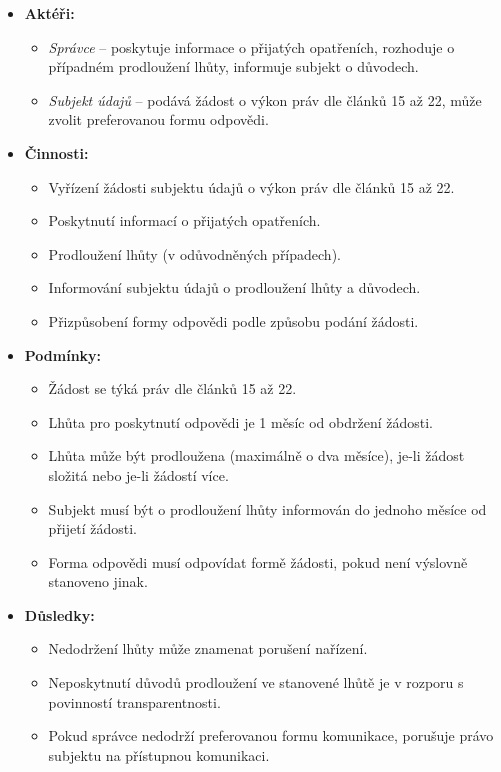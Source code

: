 \begin{itemize}
\item \textbf{Aktéři:}
  \begin{itemize}
    \item \textit{Správce} – poskytuje informace o přijatých opatřeních, rozhoduje o případném prodloužení lhůty, informuje subjekt o důvodech.
    \item \textit{Subjekt údajů} – podává žádost o výkon práv dle článků 15 až 22, může zvolit preferovanou formu odpovědi.
  \end{itemize}

\item \textbf{Činnosti:}
  \begin{itemize}
    \item Vyřízení žádosti subjektu údajů o výkon práv dle článků 15 až 22.
    \item Poskytnutí informací o přijatých opatřeních.
    \item Prodloužení lhůty (v odůvodněných případech).
    \item Informování subjektu údajů o prodloužení lhůty a důvodech.
    \item Přizpůsobení formy odpovědi podle způsobu podání žádosti.
  \end{itemize}

\item \textbf{Podmínky:}
  \begin{itemize}
    \item Žádost se týká práv dle článků 15 až 22.
    \item Lhůta pro poskytnutí odpovědi je 1 měsíc od obdržení žádosti.
    \item Lhůta může být prodloužena (maximálně o dva měsíce), je-li žádost složitá nebo je-li žádostí více.
    \item Subjekt musí být o prodloužení lhůty informován do jednoho měsíce od přijetí žádosti.
    \item Forma odpovědi musí odpovídat formě žádosti, pokud není výslovně stanoveno jinak.
  \end{itemize}

\item \textbf{Důsledky:}
  \begin{itemize}
    \item Nedodržení lhůty může znamenat porušení nařízení.
    \item Neposkytnutí důvodů prodloužení ve stanovené lhůtě je v rozporu s povinností transparentnosti.
    \item Pokud správce nedodrží preferovanou formu komunikace, porušuje právo subjektu na přístupnou komunikaci.
  \end{itemize}
\end{itemize}

